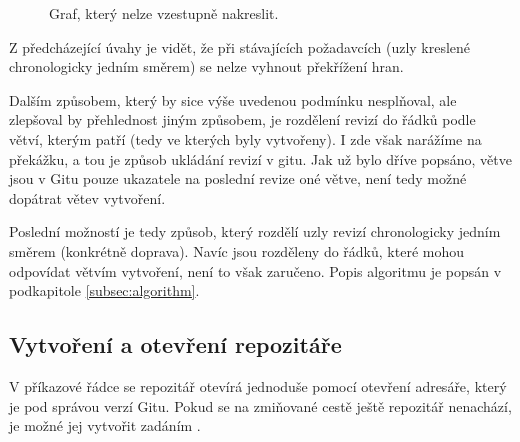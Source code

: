 \documentclass[
  biblatex,
  glossaries,
  index
]{kidiplom}
\begin{document}
\begin{figure}[h]
\centering
{}
\caption{Graf, který nelze vzestupně nakreslit.}
\label{fig:non-upward-planar}
\end{figure}

Z předcházející úvahy je vidět, že při stávajících požadavcích (uzly kreslené chronologicky jedním směrem) se nelze vyhnout překřížení hran.

Dalším způsobem, který by sice výše uvedenou podmínku nesplňoval, ale
zlepšoval by přehlednost jiným způsobem, je rozdělení revizí do řádků podle větví, kterým patří (tedy ve kterých byly vytvořeny). I zde však narážíme na překážku, a tou je způsob ukládání revizí v gitu. Jak už bylo dříve popsáno, větve jsou v Gitu pouze ukazatele na poslední revize oné větve, není tedy možné dopátrat větev vytvoření.

Poslední možností je tedy způsob, který rozdělí uzly revizí chronologicky jedním směrem (konkrétně doprava). Navíc jsou rozděleny do řádků, které mohou odpovídat větvím vytvoření, není to však zaručeno. Popis algoritmu je popsán v podkapitole \ref{subsec:algorithm}.

\subsection{Vytvoření a otevření repozitáře}
V příkazové řádce se repozitář otevírá jednoduše pomocí otevření adresáře, který je pod správou verzí Gitu. Pokud se na zmiňované cestě ještě repozitář nenachází, je možné jej vytvořit zadáním .
\end{document}
